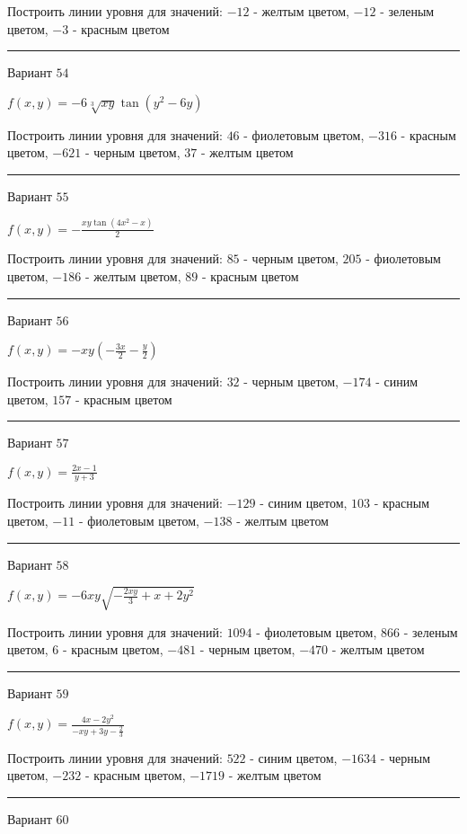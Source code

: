 \documentclass[11pt]{report}
\begin{document}
Построить линии уровня для значений: $-12$ - желтым цветом, $-12$ - зеленым цветом, $-3$ - красным цветом
\begin{center}
\noindent\rule{8cm}{0.4pt}
\end{center}
Вариант $54$


$f(x, y) = - 6 \sqrt[3]{x y} \tan{\left(y^{2} - 6 y \right)}$

Построить линии уровня для значений: $46$ - фиолетовым цветом, $-316$ - красным цветом, $-621$ - черным цветом, $37$ - желтым цветом
\begin{center}
\noindent\rule{8cm}{0.4pt}
\end{center}
Вариант $55$


$f(x, y) = - \frac{x y \tan{\left(4 x^{2} - x \right)}}{2}$

Построить линии уровня для значений: $85$ - черным цветом, $205$ - фиолетовым цветом, $-186$ - желтым цветом, $89$ - красным цветом
\begin{center}
\noindent\rule{8cm}{0.4pt}
\end{center}
Вариант $56$


$f(x, y) = - x y \left(- \frac{3 x}{2} - \frac{y}{2}\right)$

Построить линии уровня для значений: $32$ - черным цветом, $-174$ - синим цветом, $157$ - красным цветом
\begin{center}
\noindent\rule{8cm}{0.4pt}
\end{center}
Вариант $57$


$f(x, y) = \frac{2 x - 1}{y + 3}$

Построить линии уровня для значений: $-129$ - синим цветом, $103$ - красным цветом, $-11$ - фиолетовым цветом, $-138$ - желтым цветом
\begin{center}
\noindent\rule{8cm}{0.4pt}
\end{center}
Вариант $58$


$f(x, y) = - 6 x y \sqrt{- \frac{2 x y}{3} + x + 2 y^{2}}$

Построить линии уровня для значений: $1094$ - фиолетовым цветом, $866$ - зеленым цветом, $6$ - красным цветом, $-481$ - черным цветом, $-470$ - желтым цветом
\begin{center}
\noindent\rule{8cm}{0.4pt}
\end{center}
Вариант $59$


$f(x, y) = \frac{4 x - 2 y^{2}}{- x y + 3 y - \frac{2}{3}}$

Построить линии уровня для значений: $522$ - синим цветом, $-1634$ - черным цветом, $-232$ - красным цветом, $-1719$ - желтым цветом
\begin{center}
\noindent\rule{8cm}{0.4pt}
\end{center}
Вариант $60$
\end{document}
